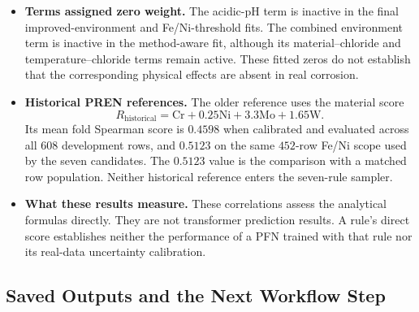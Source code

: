 \documentclass[11pt]{article}
\newenvironment{notes}
  {\begin{itemize}\setlength{\itemsep}{0.45em}\setlength{\parsep}{0pt}}
  {\end{itemize}}
\begin{document}
\begin{notes}
    \item \textbf{Terms assigned zero weight.}
    The acidic-pH term is inactive in the final
    improved-environment and Fe/Ni-threshold fits.
    The combined environment term is inactive in the
    method-aware fit, although its material--chloride and
    temperature--chloride terms remain active.
    These fitted zeros do not establish that the corresponding
    physical effects are absent in real corrosion.

    \item \textbf{Historical PREN references.}
    The older reference uses the material score
    \[
        R_{\mathrm{historical}}
        =\mathrm{Cr}+0.25\mathrm{Ni}
         +3.3\mathrm{Mo}+1.65\mathrm{W}.
    \]
    Its mean fold Spearman score is \(0.4598\) when calibrated
    and evaluated across all \(608\) development rows, and
    \(0.5123\) on the same \(452\)-row Fe/Ni scope used by the
    seven candidates. The \(0.5123\) value is the comparison
    with a matched row population. Neither historical
    reference enters the seven-rule sampler.

    \item \textbf{What these results measure.}
    These correlations assess the analytical formulas directly.
    They are not transformer prediction results.
    A rule's direct score establishes neither the performance
    of a PFN trained with that rule nor its real-data uncertainty
    calibration.
\end{notes}

\subsection{Saved Outputs and the Next Workflow Step}
\label{sec:calibration-outputs}
\end{document}
